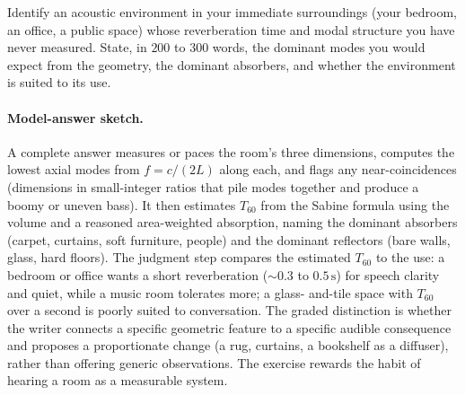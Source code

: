 \begin{exercise}
Identify an acoustic environment in your immediate surroundings
(your bedroom, an office, a public space) whose reverberation time
and modal structure you have never measured. State, in $200$ to
$300$ words, the dominant modes you would expect from the geometry,
the dominant absorbers, and whether the environment is suited to
its use.
\paragraph{Model-answer sketch.} A complete answer measures or paces
the room's three dimensions, computes the lowest axial modes from
$f = c/(2L)$ along each, and flags any near-coincidences (dimensions
in small-integer ratios that pile modes together and produce a boomy
or uneven bass). It then estimates $T_{60}$ from the Sabine formula
using the volume and a reasoned area-weighted absorption, naming the
dominant absorbers (carpet, curtains, soft furniture, people) and the
dominant reflectors (bare walls, glass, hard floors). The judgment
step compares the estimated $T_{60}$ to the use: a bedroom or office
wants a short reverberation ($\sim 0.3$ to $0.5\,\si{\second}$) for
speech clarity and quiet, while a music room tolerates more; a glass-
and-tile space with $T_{60}$ over a second is poorly suited to
conversation. The graded distinction is whether the writer connects a
specific geometric feature to a specific audible consequence and
proposes a proportionate change (a rug, curtains, a bookshelf as a
diffuser), rather than offering generic observations. The exercise
rewards the habit of hearing a room as a measurable system.
\end{exercise}
